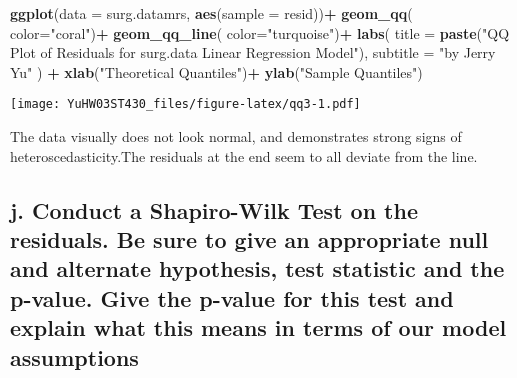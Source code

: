 \documentclass[
]{article}
\newenvironment{Shaded}{\begin{snugshade}}{\end{snugshade}}
\newcommand{\AttributeTok}[1]{\textcolor[rgb]{0.13,0.29,0.53}{#1}}
\newcommand{\FunctionTok}[1]{\textcolor[rgb]{0.13,0.29,0.53}{\textbf{#1}}}
\newcommand{\NormalTok}[1]{#1}
\newcommand{\OtherTok}[1]{\textcolor[rgb]{0.56,0.35,0.01}{#1}}
\newcommand{\SpecialCharTok}[1]{\textcolor[rgb]{0.81,0.36,0.00}{\textbf{#1}}}
\newcommand{\StringTok}[1]{\textcolor[rgb]{0.31,0.60,0.02}{#1}}
\begin{document}
\begin{Shaded}
\begin{Highlighting}[]
\FunctionTok{ggplot}\NormalTok{(}\AttributeTok{data =}\NormalTok{ surg.datamrs, }\FunctionTok{aes}\NormalTok{(}\AttributeTok{sample =}\NormalTok{ resid))}\SpecialCharTok{+}
  \FunctionTok{geom\_qq}\NormalTok{( }\AttributeTok{color=}\StringTok{"coral"}\NormalTok{)}\SpecialCharTok{+}
  \FunctionTok{geom\_qq\_line}\NormalTok{( }\AttributeTok{color=}\StringTok{"turquoise"}\NormalTok{)}\SpecialCharTok{+}
  \FunctionTok{labs}\NormalTok{(}
    \AttributeTok{title =} \FunctionTok{paste}\NormalTok{(}\StringTok{"QQ Plot of Residuals for surg.data Linear Regression Model"}\NormalTok{),}
    \AttributeTok{subtitle =} \StringTok{"by Jerry Yu"}
\NormalTok{  ) }\SpecialCharTok{+}
  \FunctionTok{xlab}\NormalTok{(}\StringTok{"Theoretical Quantiles"}\NormalTok{)}\SpecialCharTok{+}
  \FunctionTok{ylab}\NormalTok{(}\StringTok{"Sample Quantiles"}\NormalTok{)}
\end{Highlighting}
\end{Shaded}

\texttt{[image: YuHW03ST430\_files/figure-latex/qq3-1.pdf]}

The data visually does not look normal, and demonstrates strong signs of
heteroscedasticity.The residuals at the end seem to all deviate from the
line.

\hypertarget{j.-conduct-a-shapiro-wilk-test-on-the-residuals.-be-sure-to-give-an-appropriate-null-and-alternate-hypothesis-test-statistic-and-the-p-value.-give-the-p-value-for-this-test-and-explain-what-this-means-in-terms-of-our-model-assumptions}{%
\subsection{j. Conduct a Shapiro-Wilk Test on the residuals. Be sure to
give an appropriate null and alternate hypothesis, test statistic and
the p-value. Give the p-value for this test and explain what this means
in terms of our model
assumptions}\label{j.-conduct-a-shapiro-wilk-test-on-the-residuals.-be-sure-to-give-an-appropriate-null-and-alternate-hypothesis-test-statistic-and-the-p-value.-give-the-p-value-for-this-test-and-explain-what-this-means-in-terms-of-our-model-assumptions}}

\begin{Shaded}
\end{Shaded}
\end{document}

